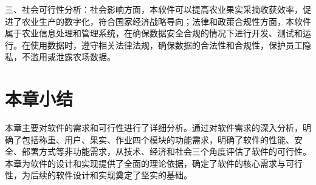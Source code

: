 三、社会可行性分析：社会影响方面，本软件可以提高农业果实采摘收获效率，促进了农业生产的数字化，符合国家经济战略导向\cite{Xu2020}；法律和政策合规性方面，本软件属于农业信息处理和管理系统，在确保数据安全合规的情况下进行开发、测试和运行。在使用数据时，遵守相关法律法规，确保数据的合法性和合规性，保护员工隐私，不滥用或泄露农场数据。

\section{本章小结}

本章主要对软件的需求和可行性进行了详细分析。通过对软件需求的深入分析，明确了包括称重、用户、果实、作业四个模块的功能需求，明确了软件的性能、安全、部署方式等非功能需求，从技术、经济和社会三个角度评估了软件的可行性。本章为软件的设计和实现提供了全面的理论依据，确定了软件的核心需求与可行性，为后续的软件设计和实现奠定了坚实的基础。
